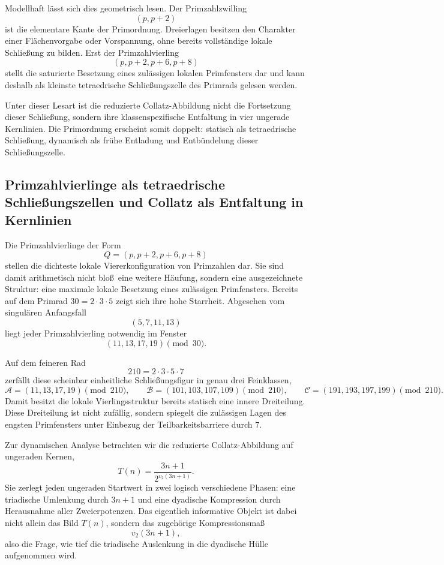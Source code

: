\documentclass[11pt,a4paper]{article}
\theoremstyle{definition}
\begin{document}
Modellhaft l\"asst sich dies geometrisch lesen. Der Primzahlzwilling
\[
(p,p+2)
\]
ist die elementare Kante der Primordnung. Dreierlagen besitzen den
Charakter einer Fl\"achenvorgabe oder Vorspannung, ohne bereits
vollst\"andige lokale Schlie\ss ung zu bilden. Erst der Primzahlvierling
\[
(p,p+2,p+6,p+8)
\]
stellt die saturierte Besetzung eines zul\"assigen lokalen Primfensters
dar und kann deshalb als kleinste tetraedrische Schlie\ss ungszelle des
Primrads gelesen werden.

Unter dieser Lesart ist die reduzierte Collatz-Abbildung nicht die
Fortsetzung dieser Schlie\ss ung, sondern ihre klassenspezifische
Entfaltung in vier ungerade Kernlinien. Die Primordnung erscheint somit
doppelt: statisch als tetraedrische Schlie\ss ung, dynamisch als fr\"uhe
Entladung und Entb\"undelung dieser Schlie\ss ungszelle.

\subsection{Primzahlvierlinge als tetraedrische Schlie\ss ungszellen und Collatz als Entfaltung in Kernlinien}

Die Primzahlvierlinge der Form
\[
Q=(p,p+2,p+6,p+8)
\]
stellen die dichteste lokale Viererkonfiguration von Primzahlen dar. Sie
sind damit arithmetisch nicht blo\ss\ eine weitere H\"aufung, sondern eine
ausgezeichnete Struktur: eine maximale lokale Besetzung eines zul\"assigen
Primfensters. Bereits auf dem Primrad $30=2\cdot3\cdot5$ zeigt sich ihre
hohe Starrheit. Abgesehen vom singul\"aren Anfangsfall
\[
(5,7,11,13)
\]
liegt jeder Primzahlvierling notwendig im Fenster
\[
(11,13,17,19)\pmod{30}.
\]

Auf dem feineren Rad
\[
210=2\cdot3\cdot5\cdot7
\]
zerf\"allt diese scheinbar einheitliche Schlie\ss ungsfigur in genau drei
Feinklassen,
\[
\mathcal A=(11,13,17,19)\pmod{210},
\qquad
\mathcal B=(101,103,107,109)\pmod{210},
\qquad
\mathcal C=(191,193,197,199)\pmod{210}.
\]
Damit besitzt die lokale Vierlingsstruktur bereits statisch eine innere
Dreiteilung. Diese Dreiteilung ist nicht zuf\"allig, sondern spiegelt die
zul\"assigen Lagen des engsten Primfensters unter Einbezug der
Teilbarkeitsbarriere durch $7$.

Zur dynamischen Analyse betrachten wir die reduzierte Collatz-Abbildung
auf ungeraden Kernen,
\[
T(n)=\frac{3n+1}{2^{v_2(3n+1)}}.
\]
Sie zerlegt jeden ungeraden Startwert in zwei logisch verschiedene
Phasen: eine triadische Umlenkung durch $3n+1$ und eine dyadische
Kompression durch Herausnahme aller Zweierpotenzen. Das eigentlich
informative Objekt ist dabei nicht allein das Bild $T(n)$, sondern das
zugeh\"orige Kompressionsma\ss\
\[
v_2(3n+1),
\]
also die Frage, wie tief die triadische Auslenkung in die dyadische H\"ulle
aufgenommen wird.
\end{document}
